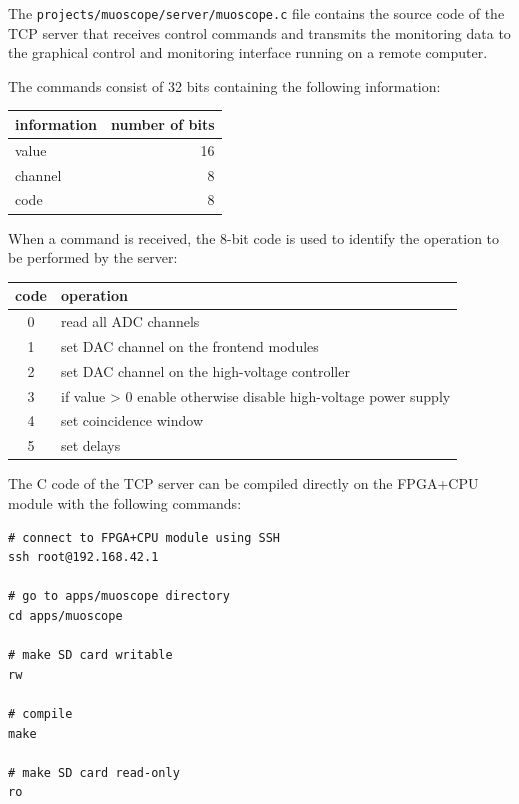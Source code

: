 \documentclass[12pt, a4paper]{article}
\begin{document}
The \texttt{projects/muoscope/server/muoscope.c} file contains the source code of the TCP server that receives control commands and transmits the monitoring data to the graphical control and monitoring interface running on a remote computer.

The commands consist of 32 bits containing the following information:
\begin{center}
  \begin{tabular}{|l|r|}
  \hline
  \textbf{information} & \textbf{number of bits} \\
  \hline
  value & 16 \\
  \hline
  channel & 8 \\
  \hline
  code & 8 \\
  \hline
  \end{tabular}
\end{center}

When a command is received, the 8-bit code is used to identify the operation to be performed by the server:
\begin{center}
  \begin{tabular}{|c|l|}
  \hline
  \textbf{code} & \textbf{operation} \\
  \hline
  0 & read all ADC channels \\
  \hline
  1 & set DAC channel on the frontend modules \\
  \hline
  2 & set DAC channel on the high-voltage controller \\
  \hline
  3 & if value > 0 enable otherwise disable high-voltage power supply \\
  \hline
  4 & set coincidence window \\
  \hline
  5 & set delays \\
  \hline
  \end{tabular}
\end{center}

The C code of the TCP server can be compiled directly on the FPGA+CPU module with the following commands:
\vspace{-1ex}
\begin{verbatim}
# connect to FPGA+CPU module using SSH
ssh root@192.168.42.1

# go to apps/muoscope directory
cd apps/muoscope

# make SD card writable
rw

# compile
make

# make SD card read-only
ro
\end{verbatim}
\end{document}
